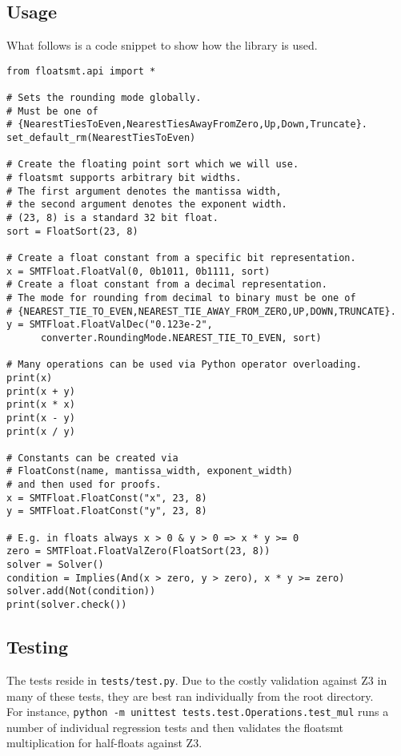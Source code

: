 \documentclass[a4paper,UKenglish,cleveref, autoref, thm-restate]{lipics-v2019}
\begin{document}
\subsection{Usage}
What follows is a code snippet to show how the library is used.
\begin{lstlisting}
from floatsmt.api import *

# Sets the rounding mode globally.
# Must be one of 
# {NearestTiesToEven,NearestTiesAwayFromZero,Up,Down,Truncate}.
set_default_rm(NearestTiesToEven)

# Create the floating point sort which we will use.
# floatsmt supports arbitrary bit widths.
# The first argument denotes the mantissa width,
# the second argument denotes the exponent width.
# (23, 8) is a standard 32 bit float.
sort = FloatSort(23, 8)

# Create a float constant from a specific bit representation.
x = SMTFloat.FloatVal(0, 0b1011, 0b1111, sort)
# Create a float constant from a decimal representation. 
# The mode for rounding from decimal to binary must be one of
# {NEAREST_TIE_TO_EVEN,NEAREST_TIE_AWAY_FROM_ZERO,UP,DOWN,TRUNCATE}.
y = SMTFloat.FloatValDec("0.123e-2", 
      converter.RoundingMode.NEAREST_TIE_TO_EVEN, sort)

# Many operations can be used via Python operator overloading.
print(x)
print(x + y)
print(x * x)
print(x - y) 
print(x / y)

# Constants can be created via 
# FloatConst(name, mantissa_width, exponent_width)
# and then used for proofs.
x = SMTFloat.FloatConst("x", 23, 8)
y = SMTFloat.FloatConst("y", 23, 8)

# E.g. in floats always x > 0 & y > 0 => x * y >= 0
zero = SMTFloat.FloatValZero(FloatSort(23, 8))
solver = Solver()
condition = Implies(And(x > zero, y > zero), x * y >= zero)
solver.add(Not(condition))
print(solver.check())
\end{lstlisting}

\subsection{Testing}
The tests reside in \verb|tests/test.py|. Due to the costly validation against Z3 in many of these tests, they are best ran individually from the root directory. \\
For instance, \verb|python -m unittest tests.test.Operations.test_mul| runs a number of individual regression tests and then validates the floatsmt multiplication for half-floats against Z3.
\end{document}
